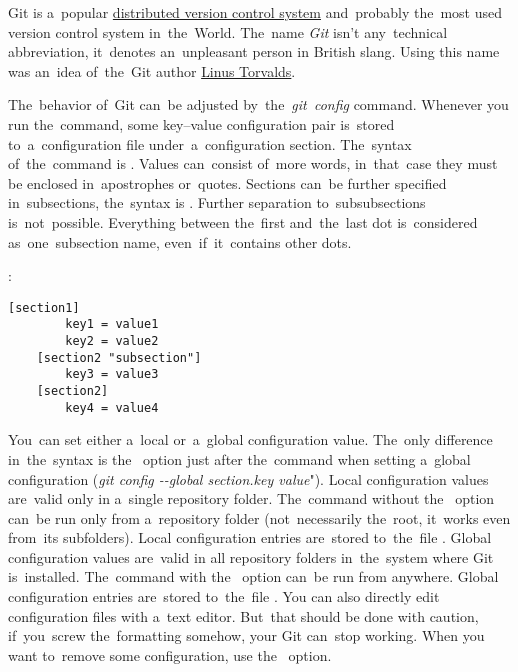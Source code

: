 \label{git}
Git is a~popular \hyperref[distributedversioncontrolsystem]{distributed version control system} and~probably the~most used version control system in~the~World. The~name \textit{Git} isn't any~technical abbreviation, it~denotes an~unpleasant person in British slang. Using this name was an~idea of~the~Git author \href{https://en.wikipedia.org/wiki/Linus_Torvalds}{Linus Torvalds}.

\label{gitconfig}
The~behavior of~Git can~be adjusted by~the~\textit{git~config} command. Whenever you run the~command, some key--value configuration pair is~stored to~a~configuration file under~a~configuration section. The~syntax of~the~command is . Values can~consist of~more words, in~that~case they must be enclosed in~apostrophes or~quotes. Sections can~be further specified in~subsections, the~syntax is . Further separation to~subsubsections is~not~possible. Everything between the~first and~the~last dot is~considered as~one~subsection name, even~if~it~contains other dots.

:
\begin{lstlisting}[frame=no]
    [section1]
        key1 = value1
        key2 = value2
    [section2 "subsection"]
        key3 = value3
    [section2]
        key4 = value4
\end{lstlisting}
\newline

\enlargethispage{-8mm}
\noindent  You~can set either a~local or~a~global configuration value. The~only difference in~the~syntax is the~ option just after the~command when setting a~global configuration (\textit{git config \mbox{-{}-global} section.key value}"). Local configuration values are~valid only in a~single repository folder. The~command without the~ option can~be run only from a~repository folder (not~necessarily the~root, it~works even from~its subfolders). Local configuration entries are~stored to~the~file . Global configuration values are~valid in all repository folders in~the~system where Git is~installed. The~command with the~ option can~be run from anywhere. Global configuration entries are~stored to~the~file . You can also directly edit configuration files with a~text editor. But~that should be done with caution, if~you~screw the~formatting somehow, your Git can~stop working. When you want to~remove some configuration, use the~ option.

